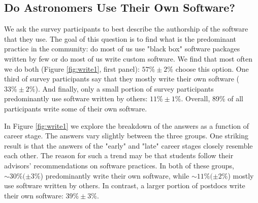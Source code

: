 \subsection{Do Astronomers Use Their Own Software?}

We ask the survey participants to best describe the authorship of the software that they use. The goal of this question is to find what is the predominant practice in the community: do most of us use "black box" software packages written by few or do most of us write custom software. We find that most often we do both (Figure \ref{fig:write1}, first panel): $57\%\pm2\%$ choose this option. One third of survey participants say that they mostly write their own software ($33\%\pm2\%$). And finally, only a small portion of survey participants predominantly use software written by others: $11\%\pm1\%$. Overall, 89\% of all participants write some of their own software.

In Figure \ref{fig:write1} we explore the breakdown of the answers as a function of career stage. The answers vary slightly between the three groups. One striking result is that the answers of the "early" and "late" career stages closely resemble each other. The reason for such a trend may be that students follow their advisors' recommendations on software practices. In both of these groups, $\sim30\%(\pm3\%$) predominantly write their own software, while $\sim11\%(\pm2\%$) mostly use software written by others. In contrast, a larger portion of postdocs write their own software: $39\%\pm3\%$. 